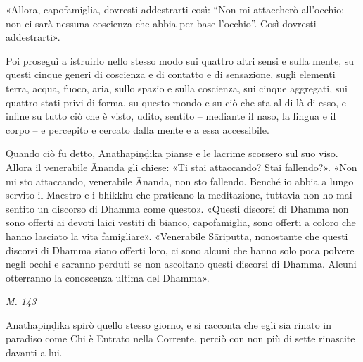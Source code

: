  «Allora, capofamiglia, dovresti addestrarti così: “Non mi
attaccherò all’occhio; non ci sarà nessuna coscienza che abbia per base
l’occhio”. Così dovresti addestrarti».


 Poi proseguì a istruirlo nello stesso modo sui
quattro altri sensi e sulla mente, su questi cinque generi di coscienza
e di contatto e di sensazione, sugli elementi terra, acqua, fuoco, aria,
sullo spazio e sulla coscienza, sui cinque aggregati, sui quattro stati
privi di forma, su questo mondo e su ciò che sta al di là di esso, e
infine su tutto ciò che è visto, udito, sentito – mediante il naso, la
lingua e il corpo – e percepito e cercato dalla mente e a essa
accessibile.


 Quando ciò fu detto, Anāthapiṇḍika pianse e le lacrime
scorsero sul suo viso. Allora il venerabile Ānanda gli chiese: «Ti stai
attaccando? Stai fallendo?». «Non mi sto attaccando, venerabile Ānanda,
non sto fallendo. Benché io abbia a lungo servito il Maestro e i bhikkhu
che praticano la meditazione, tuttavia non ho mai sentito un discorso di
Dhamma come questo». «Questi discorsi di Dhamma non sono offerti ai
devoti laici vestiti di bianco, capofamiglia, sono offerti a coloro che
hanno lasciato la vita famigliare». «Venerabile Sāriputta, nonostante
che questi discorsi di Dhamma siano offerti loro, ci sono alcuni che
hanno solo poca polvere negli occhi e saranno perduti se non ascoltano
questi discorsi di Dhamma. Alcuni otterranno la conoscenza ultima del
Dhamma».


\emph{M. 143}


 Anāthapiṇḍika spirò quello stesso giorno, e si
racconta che egli sia rinato in paradiso come Chi è Entrato nella
Corrente, perciò con non più di sette rinascite davanti a lui.


